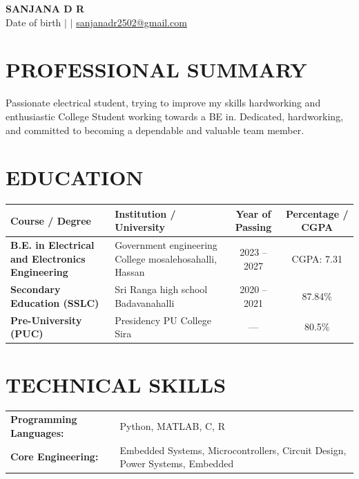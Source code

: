 \documentclass[9.5pt,a4paper]{extarticle}
\begin{document}
\begin{center}
{\Large \textbf{SANJANA D R}} \\ \vspace{2pt}
Date of birth \quad $|$  \quad $|$ \quad \href{mailto:sanjanadr2502@gmail.com}{sanjanadr2502@gmail.com}
\end{center}

\section*{PROFESSIONAL SUMMARY}
Passionate electrical student, trying to improve my skills hardworking and enthusiastic College Student working towards a BE in. Dedicated, hardworking, and committed to becoming a dependable and valuable team member.

\section*{EDUCATION}
{\small
\renewcommand{\arraystretch}{1.18}
\noindent\begin{tabularx}{\textwidth}{|p{1.7in}|X|c|c|}
\hline
\textbf{Course / Degree} & \textbf{Institution / University} & \textbf{Year of Passing} & \textbf{Percentage / CGPA} \\ \hline
\textbf{B.E. in Electrical and Electronics Engineering} & Government engineering College mosalehosahalli, Hassan & 2023 -- 2027 & CGPA: 7.31 \\ \hline
\textbf{Secondary Education (SSLC)} & Sri Ranga high school Badavanahalli & 2020 -- 2021 & 87.84\% \\ \hline
\textbf{Pre-University (PUC)} & Presidency PU College Sira & --- & 80.5\% \\ \hline
\end{tabularx}
}\vspace{4pt}


\section*{TECHNICAL SKILLS}
\begin{tabular}{@{}p{2.3in}p{4.6in}@{}}
\textbf{Programming Languages:} & Python, MATLAB, C, R \\
\textbf{Core Engineering:} & Embedded Systems, Microcontrollers, Circuit Design, Power Systems, Embedded \\
\end{tabular}
\end{document}
